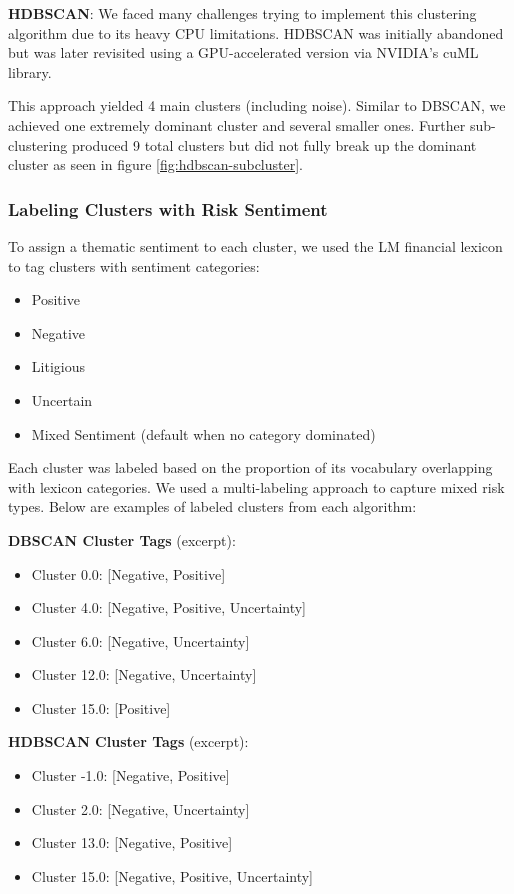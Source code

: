 \documentclass[twocolumn]{article}
\begin{document}
\textbf{HDBSCAN}:  
We faced many challenges trying to implement this clustering algorithm due to its heavy CPU limitations. HDBSCAN was initially abandoned but was later revisited using a GPU-accelerated version via NVIDIA’s cuML library\cite{sharma2025nvidia}. 

This approach yielded 4 main clusters (including noise). Similar to DBSCAN, we achieved one extremely dominant cluster and several smaller ones. Further sub-clustering produced 9 total clusters but did not fully break up the dominant cluster as seen in figure \ref{fig:hdbscan-subcluster}.

\subsubsection*{Labeling Clusters with Risk Sentiment}

To assign a thematic sentiment to each cluster, we used the LM financial lexicon to tag clusters with sentiment categories:
\begin{itemize}
    \item Positive
    \item Negative
    \item Litigious
    \item Uncertain
    \item Mixed Sentiment (default when no category dominated)
\end{itemize}

Each cluster was labeled based on the proportion of its vocabulary overlapping with lexicon categories. We used a multi-labeling approach to capture mixed risk types. Below are examples of labeled clusters from each algorithm:

\textbf{DBSCAN Cluster Tags} (excerpt):
\begin{itemize}
    \item Cluster 0.0: [Negative, Positive]
    \item Cluster 4.0: [Negative, Positive, Uncertainty]
    \item Cluster 6.0: [Negative, Uncertainty]
    \item Cluster 12.0: [Negative, Uncertainty]
    \item Cluster 15.0: [Positive]
\end{itemize}

\textbf{HDBSCAN Cluster Tags} (excerpt):
\begin{itemize}
    \item Cluster -1.0: [Negative, Positive]
    \item Cluster 2.0: [Negative, Uncertainty]
    \item Cluster 13.0: [Negative, Positive]
    \item Cluster 15.0: [Negative, Positive, Uncertainty]
\end{itemize}
\end{document}
